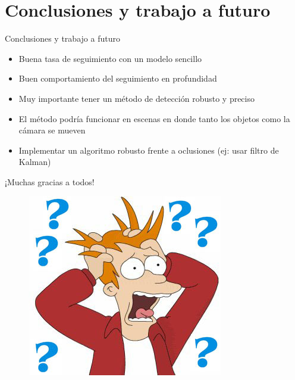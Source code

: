 \documentclass[]{beamer}
\begin{document}
\section{Conclusiones y trabajo a futuro}
\begin{frame}{Conclusiones y trabajo a futuro}
    \begin{itemize}
        \item Buena tasa de seguimiento con un modelo sencillo
        \item Buen comportamiento del seguimiento en profundidad
        \item Muy importante tener un método de detección robusto y preciso
        \item El método podría funcionar en escenas en donde tanto los objetos como la cámara se mueven
        \item Implementar un algoritmo robusto frente a oclusiones (ej: usar filtro de Kalman)
    \end{itemize}
\end{frame}

\begin{frame}[t]{¡Muchas gracias a todos!}
    \begin{figure}
        \centering
        \includegraphics[scale=0.5]{img/preguntas.jpg}
    \end{figure}
\end{frame}
\end{document}
